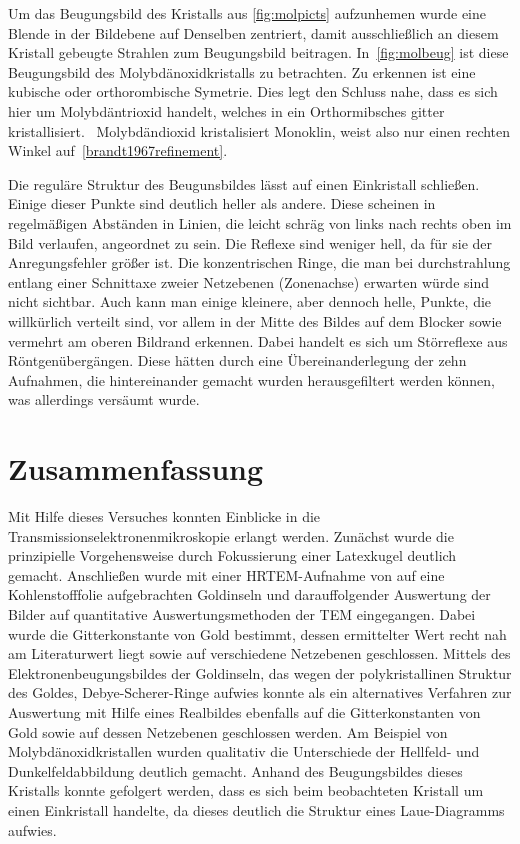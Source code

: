 \documentclass[slug=TEM, room=IFW, supervisor=?, coursedate=23.\ 01.\ 2020]{../../Lab_Report_LaTeX/lab_report}
\begin{document}
Um das Beugungsbild des Kristalls aus \ref{fig:molpicts} aufzunhemen
wurde eine Blende in der Bildebene auf Denselben zentriert, damit
ausschlie\ss{}lich an diesem Kristall gebeugte Strahlen zum
Beugungsbild beitragen.  In~\ref{fig:molbeug} ist diese Beugungsbild
des Molybdänoxidkristalls zu betrachten. Zu erkennen ist eine kubische
oder orthorombische Symetrie. Dies legt den Schluss nahe, dass es sich
hier um Molybdäntrioxid handelt, welches in ein Orthormibsches gitter
kristallisiert.~\cite{WOOSTER1931} Molybdändioxid kristalisiert
Monoklin, weist also nur einen rechten Winkel
auf~\ref{brandt1967refinement}.

Die regul\"are Struktur des Beugunsbildes l\"asst auf einen
Einkristall schließen. Einige dieser Punkte sind deutlich heller als
andere. Diese scheinen in regelmäßigen Abständen in Linien, die leicht
schräg von links nach rechts oben im Bild verlaufen, angeordnet zu
sein. Die Reflexe sind weniger hell, da f\"ur sie der Anregungsfehler
gr\"o\ss{}er ist. Die konzentrischen Ringe, die man bei durchstrahlung
entlang einer Schnittaxe zweier Netzebenen (Zonenachse) erwarten
w\"urde sind nicht sichtbar.  Auch kann man einige kleinere, aber
dennoch helle, Punkte, die willkürlich verteilt sind, vor allem in der
Mitte des Bildes auf dem Blocker sowie vermehrt am oberen Bildrand
erkennen. Dabei handelt es sich um Störreflexe aus
R\"ontgen\"uberg\"angen. Diese hätten durch eine Übereinanderlegung
der zehn Aufnahmen, die hintereinander gemacht wurden herausgefiltert
werden können, was allerdings versäumt wurde.

\section{Zusammenfassung}
\label{sec:zusfassung}

Mit Hilfe dieses Versuches konnten Einblicke in die Transmissionselektronenmikroskopie erlangt
werden. Zunächst wurde die prinzipielle Vorgehensweise durch Fokussierung einer Latexkugel
deutlich gemacht. Anschließen wurde mit einer HRTEM-Aufnahme von auf eine Kohlenstofffolie
aufgebrachten Goldinseln und darauffolgender Auswertung der Bilder auf quantitative
Auswertungsmethoden der TEM eingegangen. Dabei wurde die Gitterkonstante von Gold bestimmt, dessen
ermittelter Wert recht nah am Literaturwert liegt sowie auf verschiedene Netzebenen geschlossen. 
Mittels des Elektronenbeugungsbildes der Goldinseln, das wegen der polykristallinen Struktur des 
Goldes, Debye-Scherer-Ringe aufwies konnte als ein alternatives Verfahren zur Auswertung mit 
Hilfe eines Realbildes ebenfalls auf die Gitterkonstanten von Gold sowie auf dessen Netzebenen 
geschlossen werden. Am Beispiel von Molybdänoxidkristallen wurden qualitativ die Unterschiede der 
Hellfeld- und Dunkelfeldabbildung deutlich gemacht. Anhand des Beugungsbildes dieses Kristalls 
konnte gefolgert werden, dass es sich beim beobachteten Kristall um einen Einkristall handelte, da
dieses deutlich die Struktur eines Laue-Diagramms aufwies. 
\end{document}
